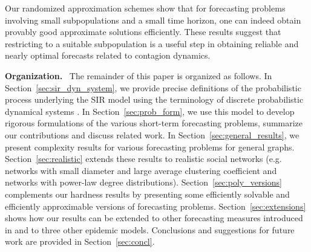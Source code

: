 \medskip
Our randomized approximation schemes show that for forecasting
problems involving small subpopulations and a small time horizon,
one can indeed obtain provably good approximate solutions efficiently. 
These results suggest that restricting to a suitable 
subpopulation is a useful step in obtaining reliable and nearly optimal
forecasts related to contagion dynamics.
\fi

\medskip

\noindent
\textbf{Organization.}~
The remainder of this paper is organized as follows.
In Section~\ref{sec:sir_dyn_system}, we provide precise definitions
of the probabilistic process underlying the SIR model using the
terminology of discrete probabilistic dynamical systems \cite{BH+2011}.
In Section~\ref{sec:prob_form}, we use this model
to develop rigorous formulations of the various short-term 
forecasting problems, summarize our contributions and discuss related work. 
In Section~\ref{sec:general_results}, we present complexity
results for various forecasting problems for general graphs.
Section~\ref{sec:realistic} extends these results to realistic social
networks (e.g. networks with small diameter and large average clustering
coefficient and networks with power-law degree distributions).
Section~\ref{sec:poly_versions} complements our hardness results by
presenting some efficiently solvable and efficiently approximable 
versions of forecasting problems.
Section~\ref{sec:extensions} shows how our results can be extended to 
other forecasting measures introduced in \cite{TC+2016} and to three
other epidemic models.
Conclusions and suggestions for future work are provided 
in Section~\ref{sec:concl}.
